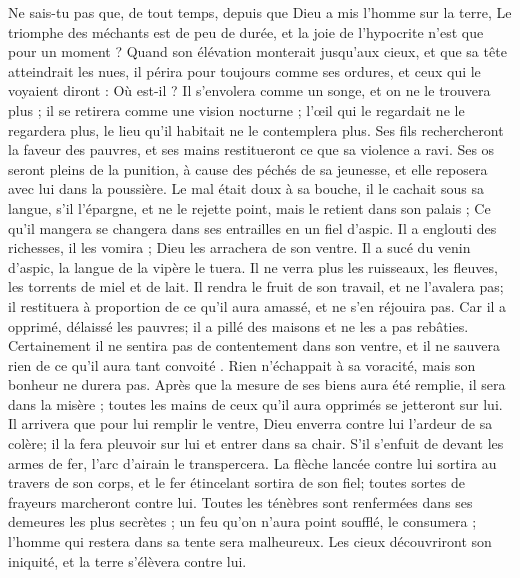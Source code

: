 \begin{multicols}{2}
Ne sais-tu pas que, de tout temps, depuis que Dieu a mis l'homme sur la terre, 
Le triomphe des méchants est de peu de durée, et la joie de l'hypocrite n'est que pour un moment  ?
Quand son élévation monterait jusqu'aux cieux, et que sa tête atteindrait les nues,
il périra pour toujours comme ses ordures, et ceux qui le voyaient diront : Où est-il ?
Il s'envolera comme un songe, et on ne le trouvera plus ; il se  retirera comme une vision nocturne ;
l'œil qui le regardait ne le regardera plus, le lieu qu'il habitait ne le contemplera plus.
Ses fils rechercheront la faveur des pauvres, et ses mains restitueront ce que sa violence a ravi.
Ses os seront pleins de la punition, à  cause des péchés de sa jeunesse, et elle reposera avec lui dans la poussière.
Le mal était doux à sa bouche, il le cachait sous sa langue,
s'il l'épargne, et ne le rejette point, mais le retient dans son palais ; 
Ce qu'il mangera se changera dans ses entrailles en un fiel d'aspic.
Il a englouti des richesses, il les vomira ; Dieu les arrachera de son ventre.
Il a sucé du venin d'aspic, la langue de la vipère le tuera.
Il ne verra plus les ruisseaux, les fleuves, les torrents de miel et de lait.
Il rendra le fruit de son travail, et ne l'avalera pas; il restituera à proportion de ce qu'il aura amassé, et ne s'en réjouira pas.
Car il a opprimé, délaissé les pauvres; il a pillé des maisons et ne les a pas rebâties.
Certainement il ne sentira pas de contentement dans son ventre, et il ne sauvera rien de ce qu'il aura tant convoité .
Rien n'échappait à sa voracité, mais son bonheur ne durera pas.
Après que la mesure de ses biens aura été remplie, il sera dans la misère ; toutes les mains de ceux qu'il aura opprimés se jetteront sur lui.
Il arrivera que pour lui remplir le ventre, Dieu enverra contre lui l'ardeur de sa colère; il la fera pleuvoir sur lui et entrer dans sa chair.
S’il s’enfuit de devant les armes de fer, l’arc d’airain le transpercera.
La flèche lancée contre lui sortira au travers de son corps, et le fer étincelant sortira de son fiel; toutes sortes de frayeurs marcheront contre lui.
Toutes les ténèbres sont renfermées dans ses demeures les plus secrètes ; un feu qu'on n'aura point soufflé, le consumera ; l'homme qui restera dans sa tente sera malheureux.
Les cieux découvriront son iniquité, et la terre s'élèvera contre lui. 

\end{multicols}

